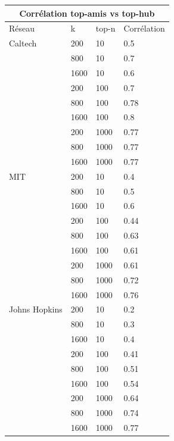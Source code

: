 \documentclass{article}
\begin{document}
\begin{tabular}{ |p{3.5cm}||p{1cm}|p{2cm}|p{3cm}|  }
    \hline
    \multicolumn{4}{|c|}{Corrélation top-amis vs top-hub} \\
    \hline
    Réseau & k & top-n & Corrélation \\
    \hline
    Caltech          & 200  & 10 & 0.5 \\
                     & 800  & 10 & 0.7 \\
                     & 1600 & 10 & 0.6 \\
                     & 200  & 100 & 0.7 \\
                     & 800  & 100 & 0.78 \\
                     & 1600 & 100 & 0.8 \\
                     & 200  & 1000 & 0.77 \\
                     & 800  & 1000 & 0.77 \\
                     & 1600 & 1000 & 0.77 \\
    \hhline{|=|=|=|=|}
    MIT              & 200  & 10 & 0.4 \\
                     & 800  & 10 & 0.5 \\
                     & 1600 & 10 & 0.6 \\
                     & 200  & 100 & 0.44 \\
                     & 800  & 100 & 0.63 \\
                     & 1600 & 100 & 0.61 \\
                     & 200  & 1000 & 0.61 \\
                     & 800  & 1000 & 0.72 \\
                     & 1600 & 1000 & 0.76 \\
    \hhline{|=|=|=|=|}
    Johns Hopkins    & 200  & 10 & 0.2 \\
                     & 800  & 10 & 0.3 \\
                     & 1600 & 10 & 0.4 \\
                     & 200  & 100 & 0.41 \\
                     & 800  & 100 & 0.51 \\
                     & 1600 & 100 & 0.54 \\
                     & 200  & 1000 & 0.64 \\
                     & 800  & 1000 & 0.74 \\
                     & 1600 & 1000 & 0.77 \\
    \hline
\end{tabular}
\end{document}
